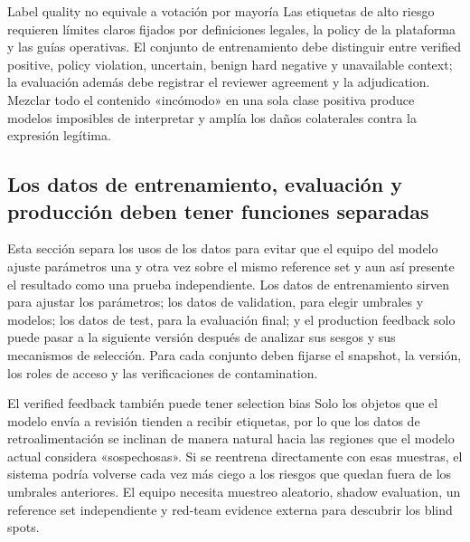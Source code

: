\begin{importantbox}{Label quality no equivale a votación por mayoría}
Las etiquetas de alto riesgo requieren límites claros fijados por definiciones legales, la policy de la plataforma y las guías operativas. El conjunto de entrenamiento debe distinguir entre verified positive, policy violation, uncertain, benign hard negative y unavailable context; la evaluación además debe registrar el reviewer agreement y la adjudication. Mezclar todo el contenido «incómodo» en una sola clase positiva produce modelos imposibles de interpretar y amplía los daños colaterales contra la expresión legítima.
\end{importantbox}


\subsection{Los datos de entrenamiento, evaluación y producción deben tener funciones separadas}

Esta sección separa los usos de los datos para evitar que el equipo del modelo ajuste parámetros una y otra vez sobre el mismo reference set y aun así presente el resultado como una prueba independiente. Los datos de entrenamiento sirven para ajustar los parámetros; los datos de validation, para elegir umbrales y modelos; los datos de test, para la evaluación final; y el production feedback solo puede pasar a la siguiente versión después de analizar sus sesgos y sus mecanismos de selección. Para cada conjunto deben fijarse el snapshot, la versión, los roles de acceso y las verificaciones de contamination.

\begin{warningbox}{El verified feedback también puede tener selection bias}
Solo los objetos que el modelo envía a revisión tienden a recibir etiquetas, por lo que los datos de retroalimentación se inclinan de manera natural hacia las regiones que el modelo actual considera «sospechosas». Si se reentrena directamente con esas muestras, el sistema podría volverse cada vez más ciego a los riesgos que quedan fuera de los umbrales anteriores. El equipo necesita muestreo aleatorio, shadow evaluation, un reference set independiente y red-team evidence externa para descubrir los blind spots.
\end{warningbox}

